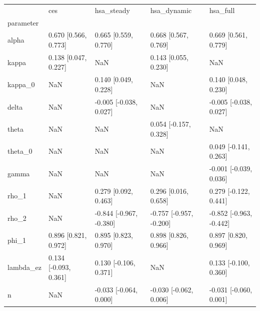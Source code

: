 \begin{tabular}{lllll}
\toprule
 & ces & hsa\_steady & hsa\_dynamic & hsa\_full \\
parameter &  &  &  &  \\
\midrule
alpha & 0.670 [0.566, 0.773] & 0.665 [0.559, 0.770] & 0.668 [0.567, 0.769] & 0.669 [0.561, 0.779] \\
kappa & 0.138 [0.047, 0.227] & NaN & 0.143 [0.055, 0.230] & NaN \\
kappa\_0 & NaN & 0.140 [0.049, 0.228] & NaN & 0.140 [0.048, 0.230] \\
delta & NaN & -0.005 [-0.038, 0.027] & NaN & -0.005 [-0.038, 0.027] \\
theta & NaN & NaN & 0.054 [-0.157, 0.328] & NaN \\
theta\_0 & NaN & NaN & NaN & 0.049 [-0.141, 0.263] \\
gamma & NaN & NaN & NaN & -0.001 [-0.039, 0.036] \\
rho\_1 & NaN & 0.279 [0.092, 0.463] & 0.296 [0.016, 0.658] & 0.279 [-0.122, 0.441] \\
rho\_2 & NaN & -0.844 [-0.967, -0.380] & -0.757 [-0.957, -0.200] & -0.852 [-0.963, -0.442] \\
phi\_1 & 0.896 [0.821, 0.972] & 0.895 [0.823, 0.970] & 0.898 [0.826, 0.966] & 0.897 [0.820, 0.969] \\
lambda\_ez & 0.134 [-0.093, 0.361] & 0.130 [-0.106, 0.371] & NaN & 0.133 [-0.100, 0.360] \\
n & NaN & -0.033 [-0.064, 0.000] & -0.030 [-0.062, 0.006] & -0.031 [-0.060, 0.001] \\
\bottomrule
\end{tabular}

